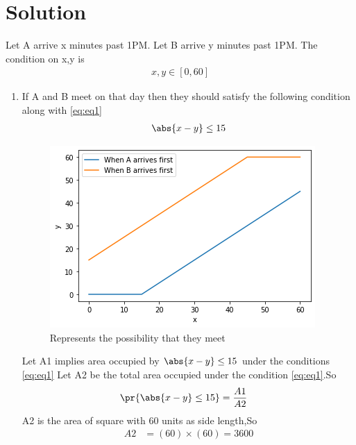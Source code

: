\documentclass[journal,12pt,twocolumn]{IEEEtran}
\begin{document}
\section{Solution}
Let A arrive x minutes past 1PM.
\newline
Let B arrive y minutes past 1PM.
\newline \newline
The condition on x,y is
\begin{align}
    x,y \in [0,60]
    \label{eq:eq1}
\end{align}
\begin{enumerate}
    \item 
If A and B meet on that day then they should satisfy the following condition along with \eqref{eq:eq1}
\begin{align}
    \abs{x - y}\leq15
    \label{eq:eq2}
\end{align}
\newline
\begin{figure}[ht]
    \centering
    \includegraphics[width=\columnwidth]{Assignment3.png}
    \caption{Represents the possibility that  they meet }
    \label{fig:graph1}
\end{figure}
Let A1 implies area occupied by $\abs{x-y}\leq 15 $ under the conditions \eqref{eq:eq1}
\newline
Let A2 be the total area occupied under the condition \eqref{eq:eq1}.So
\begin{align}
    \pr{\abs{x - y}\leq15}&=\frac{A1}{A2}
    \label{eq:eq3}
\end{align}
A2 is the area of square with 60 units as side length,So
\begin{align}
    A2&=(60)\times(60)=3600

\end{align}
\end{enumerate}
\end{document}
